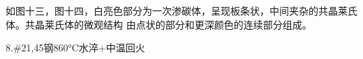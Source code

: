 \documentclass[a4paper,utf8]{article}
\begin{document}
如图十三，图十四，白亮色部分为一次渗碳体，呈现板条状，中间夹杂的共晶莱氏体。共晶莱氏体的微观结构
由点状的部分和更深颜色的连续部分组成。
\begin{figure}[!ht]
    \begin{floatrow}
            
    \end{floatrow}

\end{figure}

8.\#21,45钢860°C水淬+中温回火
\end{document}
